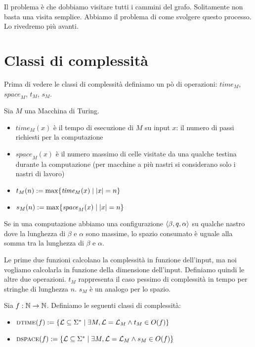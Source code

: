 Il problema è che dobbiamo visitare tutti i cammini del grafo. Solitamente non basta una visita
semplice. Abbiamo il problema di come svolgere questo processo. Lo rivedremo più avanti.

\section{Classi di complessità}

Prima di vedere le classi di complessità definiamo un pò di operazioni: $\textit{time}_{M}$,
$\textit{space}_{M}$, $t_{M}$, $s_{M}$.

\begin{defn}
    Sia $M$ una Macchina di Turing.
    \begin{itemize}
        \item $\textit{time}_{M}(x)$ è il tempo di esecuzione di $M$ su input $x$: il numero di
        passi richiesti per la computazione
        \item $\textit{space}_{M}(x)$ è il numero massimo di celle visitate da una qualche testina
        durante la computazione (per macchine a più nastri si considerano solo i nastri di lavoro)
        \item $t_{M}(n) := \max\{\textit{time}_{M}(x) \mid |x| = n\}$
        \item $s_{M}(n) := \max\{\textit{space}_{M}(x) \mid |x| = n\}$
    \end{itemize}
\end{defn}

Se in una computazione abbiamo una configurazione $\langle \beta, q, \alpha \rangle$ su qualche nastro dove
la lunghezza di $\beta$ e $\alpha$ sono massime, lo spazio consumato è uguale alla somma tra la
lunghezza di $\beta$ e $\alpha$.

Le prime due funzioni calcolano la complessità in funzione dell'input, ma noi vogliamo calcolarla
in funzione della dimensione dell'input. Definiamo quindi le altre due operazioni. $t_{M}$
rappresenta il caso pessimo di complessità in tempo per stringhe di lunghezza $n$. $s_{M}$ è un
analogo per lo spazio.

\begin{defn}
    Sia $f:\mathbb{N} \to \mathbb{N}$. Definiamo le seguenti classi di complessità:
    \begin{itemize}
        \item $\textsc{dtime}(f) := \{\mathcal{L} \subseteq \Sigma^{*} \mid \exists M, \mathcal{L} = \mathcal{L}_{M} \land
        t_{M} \in O(f)\}$
        \item $\textsc{dspace}(f) := \{\mathcal{L} \subseteq \Sigma^{*} \mid \exists M, \mathcal{L} = \mathcal{L}_{M} \land
        s_{M} \in O(f)\}$
    \end{itemize}
\end{defn}

